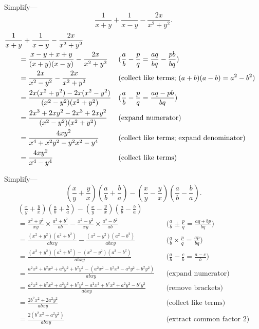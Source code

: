 \documentclass[DIN, pagenumber=false, fontsize=11pt, parskip=half]{scrartcl}
\begin{document}
\begin{problems}[from=1,step=1]
    \problem Simplify---
    \[
        \frac{1}{x+y} + \frac{1}{x-y} - \frac{2x}{x^2+y^2}.
    \]
    \answer 
    \begin{align*}
        \MoveEqLeft
        \frac{1}{x+y} + \frac{1}{x-y} - \frac{2x}{x^2+y^2}\\ 
        &= \frac{x-y+x+y}{(x+y)(x-y)} - \frac{2x}{x^2+y^2} && \text{($\frac{a}{b} - \frac{p}{q} = \frac{aq}{bq} - \frac{pb}{bq}$)}\\ 
        &= \frac{2x}{x^2-y^2} - \frac{2x}{x^2+y^2} && \text{(collect like terms; $(a+b)(a-b) = a^2-b^2$)}\\ 
        &= \frac{2x(x^2+y^2)-2x(x^2-y^2)}{(x^2-y^2)(x^2+y^2)} && \text{($\frac{a}{b} - \frac{p}{q} = \frac{aq-pb}{bq}$)}\\ 
        &= \frac{2x^3+2xy^2-2x^3+2xy^2}{(x^2-y^2)(x^2+y^2)} && \text{(expand numerator)}\\ 
        &= \frac{4xy^2}{x^4+x^2y^2-y^2x^2-y^4} && \text{(collect like terms; expand denominator)}\\ 
        &= \frac{4xy^2}{x^4-y^4} && \text{(collect like terms)}
    \end{align*}

    \problem Simplify---
    \[
        \left(\frac{x}{y} + \frac{y}{x}\right)\left(\frac{a}{b} + \frac{b}{a}\right) - \left(\frac{x}{y} - \frac{y}{x}\right)\left(\frac{a}{b} - \frac{b}{a}\right).
    \]
    \answer
    \begin{align*}
        \left(\frac{x}{y} + \frac{y}{x}\right)\left(\frac{a}{b} + \frac{b}{a}\right) - \left(\frac{x}{y} - \frac{y}{x}\right)\left(\frac{a}{b} - \frac{b}{a}\right) &\\ 
        = \frac{x^2+y^2}{xy} \times \frac{a^2+b^2}{ab} - \frac{x^2-y^2}{xy} \times \frac{a^2-b^2}{ab} && \text{($\frac{a}{b} \pm \frac{p}{q} = \frac{aq \pm bp}{bq}$)}\\ 
        = \frac{(x^2+y^2)(a^2+b^2)}{abxy} - \frac{(x^2-y^2)(a^2-b^2)}{abxy} && \text{($\frac{a}{b} \times \frac{p}{q} = \frac{ap}{bq}$)}\\ 
        = \frac{(x^2+y^2)(a^2+b^2) - (x^2-y^2)(a^2-b^2)}{abxy} && \text{($\frac{a}{b} - \frac{c}{b} = \frac{a-c}{b}$)}\\ 
        = \frac{a^2x^2 + b^2x^2 + a^2y^2 + b^2y^2 - (a^2x^2 - b^2x^2 - a^2y^2 + b^2y^2)}{abxy} && \text{(expand numerator)}\\ 
        = \frac{a^2x^2 + b^2x^2 + a^2y^2 + b^2y^2 - a^2x^2 + b^2x^2 + a^2y^2 - b^2y^2}{abxy} && \text{(remove brackets)}\\ 
        = \frac{2b^2x^2 + 2a^2y^2}{abxy} && \text{(collect like terms)}\\ 
        = \frac{2(b^2x^2 + a^2y^2)}{abxy} && \text{(extract common factor $2$)}
    \end{align*}


\end{problems}
\end{document}
